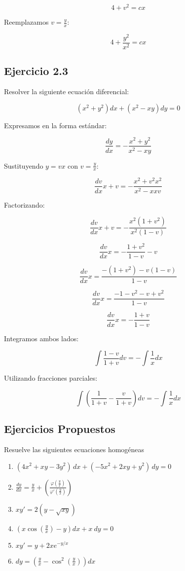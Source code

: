 \[
4+v^{2} = cx
\]

Reemplazamos \( v = \frac{y}{x} \):

\[
4+\frac{y^{2}}{x^{2}} = cx
\]


\subsection{Ejercicio 2.3}

Resolver la siguiente ecuación diferencial:

\[
(x^{2} +y^{2}) dx + (x^{2} -xy) dy = 0
\]

Expresamos en la forma estándar:

\[
\frac{dy}{dx} = -\frac{x^{2} +y^{2}}{x^{2} -xy}
\]

Sustituyendo \( y = vx \) con \( v = \frac{y}{x} \):

\[
\frac{dv}{dx} x + v = -\frac{x^{2} + v^{2} x^{2}}{x^{2} - x x v}
\]

Factorizando:

\[
\frac{dv}{dx} x + v = -\frac{x^{2} (1 + v^{2})}{x^{2} (1 - v)}
\]

\[
\frac{dv}{dx} x = -\frac{1 + v^{2}}{1 - v} - v
\]

\[
\frac{dv}{dx} x = \frac{- (1 + v^{2}) - v (1 - v)}{1 - v}
\]

\[
\frac{dv}{dx} x = \frac{-1 - v^{2} - v + v^{2}}{1 - v}
\]

\[
\frac{dv}{dx} x = -\frac{1 + v}{1 - v}
\]

Integramos ambos lados:

\[
\int \frac{1 - v}{1 + v} dv = -\int \frac{1}{x} dx
\]

Utilizando fracciones parciales:

\[
\int \left( \frac{1}{1+v} - \frac{v}{1+v} \right) dv = -\int \frac{1}{x} dx
\]




\subsection*{Ejercicios Propuestos}
Resuelve las siguientes ecuaciones homogéneas
\begin{enumerate}
    \item $(4x^{2} +xy-3y^{2} )\,dx+(-5x^{2} +2xy+y^{2} )\,dy=0$
    \item $\frac{dy}{dx} =\frac{y}{x} +\left(\frac{\varphi \left(\frac{y}{x}\right)}{\varphi '\left(\frac{y}{x}\right)}\right)$
    \item $xy'=2(y-\sqrt{xy})$
    \item $\left( x\cos\left(\frac{y}{x}\right) -y\right) dx+x\ dy=0$
    \item $xy'=y+2xe^{-y/x}$
    \item $dy =\left(\frac{y}{x} -\cos^{2}\left(\frac{y}{x}\right)\right) dx$
\end{enumerate}

